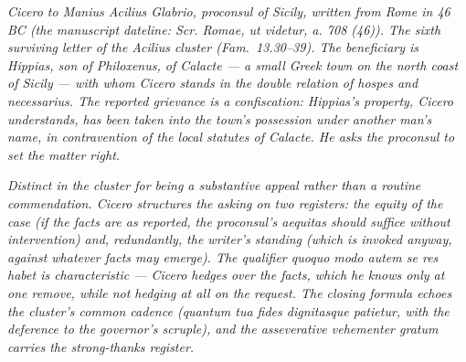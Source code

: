 
\textit{Cicero to Manius Acilius Glabrio, proconsul of
Sicily, written from Rome in 46 BC (the manuscript
dateline: \textit{Scr. Romae, ut videtur, a. 708 (46)}).
The sixth surviving letter of the Acilius cluster (Fam.\
13.30--39). The beneficiary is Hippias, son of
Philoxenus, of Calacte --- a small Greek town on the
north coast of Sicily --- with whom Cicero stands in the
double relation of \textit{hospes} and \textit{necessarius}.
The reported grievance is a confiscation: Hippias's
property, Cicero understands, has been taken into the
town's possession under another man's name, in
contravention of the local statutes of Calacte. He asks
the proconsul to set the matter right.}

\textit{Distinct in the cluster for being a substantive
appeal rather than a routine commendation. Cicero
structures the asking on two registers: the equity of
the case (if the facts are as reported, the proconsul's
\textit{aequitas} should suffice without intervention)
and, redundantly, the writer's standing (which is
invoked anyway, against whatever facts may emerge).
The qualifier \textit{quoquo modo autem se res habet} is
characteristic --- Cicero hedges over the facts, which he
knows only at one remove, while not hedging at all on
the request. The closing formula echoes the cluster's
common cadence (\textit{quantum tua fides dignitasque
patietur}, with the deference to the governor's
scruple), and the asseverative \textit{vehementer
gratum} carries the strong-thanks register.}
